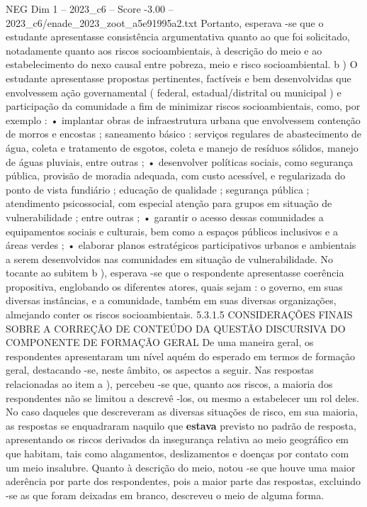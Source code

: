 \begin{textsample}{NEG Dim 1 – 2023\_c6 – Score -3.00 – 2023\_c6/enade\_2023\_zoot\_a5e91995a2.txt}
Portanto, esperava -se que o estudante apresentasse consistência argumentativa quanto ao que foi solicitado, notadamente quanto aos riscos socioambientais, à descrição do meio e ao estabelecimento do nexo causal entre pobreza, meio e risco socioambiental. b ) O estudante apresentasse propostas pertinentes, factíveis e bem desenvolvidas que envolvessem ação governamental ( federal, estadual/distrital ou municipal ) e participação da comunidade a fim de minimizar riscos socioambientais, como, por exemplo : • implantar obras de infraestrutura urbana que envolvessem contenção de morros e encostas ; saneamento básico : serviços regulares de abastecimento de água, coleta e tratamento de esgotos, coleta e manejo de resíduos sólidos, manejo de águas pluviais, entre outras ; • desenvolver políticas sociais, como segurança pública, provisão de moradia adequada, com custo acessível, e regularizada do ponto de vista fundiário ; educação de qualidade ; segurança pública ; atendimento psicossocial, com especial atenção para grupos em situação de vulnerabilidade ; entre outras ; • garantir o acesso dessas comunidades a equipamentos sociais e culturais, bem como a espaços públicos inclusivos e a áreas verdes ; • elaborar planos estratégicos participativos urbanos e ambientais a serem desenvolvidos nas comunidades em situação de vulnerabilidade.
No tocante ao subitem b ), esperava -se que o respondente apresentasse coerência propositiva, englobando os diferentes atores, quais sejam : o governo, em suas diversas instâncias, e a comunidade, também em suas diversas organizações, almejando conter os riscos socioambientais. 5.3.1.5 CONSIDERAÇÕES FINAIS SOBRE A CORREÇÃO DE CONTEÚDO DA QUESTÃO DISCURSIVA DO COMPONENTE DE FORMAÇÃO GERAL De uma maneira geral, os respondentes apresentaram um nível aquém do esperado em termos de formação geral, destacando -se, neste âmbito, os aspectos a seguir.
Nas respostas relacionadas ao item a ), percebeu -se que, quanto aos riscos, a maioria dos respondentes não se limitou a descrevê -los, ou mesmo a estabelecer um rol deles.
No caso daqueles que descreveram as diversas situações de risco, em sua maioria, as respostas se enquadraram naquilo que \textbf{estava} previsto no padrão de resposta, apresentando os riscos derivados da insegurança relativa ao meio geográfico em que habitam, tais como alagamentos, deslizamentos e doenças por contato com um meio insalubre.
Quanto à descrição do meio, notou -se que houve uma maior aderência por parte dos respondentes, pois a maior parte das respostas, excluindo -se as que foram deixadas em branco, descreveu o meio de alguma forma.

\end{textsample}
